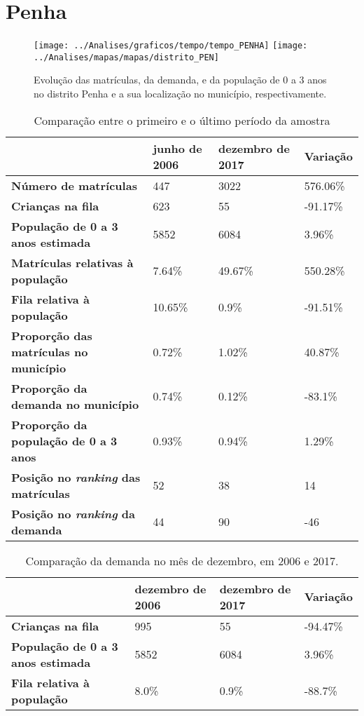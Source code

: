 \section{Penha}
\begin{figure}[H]
\centering
\texttt{[image: ../Analises/graficos/tempo/tempo\_PENHA]}
\texttt{[image: ../Analises/mapas/mapas/distrito\_PEN]}
\caption{Evolução das matrículas, da demanda, e da população de 0 a 3 anos no distrito Penha e a sua localização no município, respectivamente.}
\end{figure}
\begin{table}[H]
\begin{tabular}{l|l|l|l}
\textbf{}                                      & \textbf{junho de 2006}       & \textbf{dezembro de 2017}    & \textbf{Variação} \\ \hline
\textbf{Número de matrículas}                  & 447 & 3022 & 576.06\% \\ \hline
\textbf{Crianças na fila}                      & 623 & 55 & -91.17\% \\ \hline
\textbf{População de 0 a 3 anos estimada}      & 5852 & 6084 & 3.96\% \\ \hline
\textbf{Matrículas relativas à população}      & 7.64\% & 49.67\% & 550.28\% \\ \hline
\textbf{Fila relativa à população}             & 10.65\% & 0.9\% & -91.51\% \\ \hline
\textbf{Proporção das matrículas no município} & 0.72\% & 1.02\% & 40.87\% \\ \hline
\textbf{Proporção da demanda no município}     & 0.74\% & 0.12\% & -83.1\% \\ \hline
\textbf{Proporção da população de 0 a 3 anos}  & 0.93\% & 0.94\% & 1.29\% \\ \hline
\textbf{Posição no \textit{ranking} das matrículas}     & 52 & 38 & 14 \\ \hline
\textbf{Posição no \textit{ranking} da demanda}         & 44 & 90 & -46 \\ 
\end{tabular}
\caption{Comparação entre o primeiro e o último período da amostra}
\end{table}
\begin{table}[H]
\begin{tabular}{l|l|l|l}
\textbf{}                                 & \textbf{dezembro de 2006} & \textbf{dezembro de 2017} & \textbf{Variação} \\ \hline
\textbf{Crianças na fila}                      & 995 & 55 & -94.47\% \\ \hline
\textbf{População de 0 a 3 anos estimada}      & 5852 & 6084 & 3.96\% \\ \hline
\textbf{Fila relativa à população}             & 8.0\% & 0.9\% & -88.7\% \\
\end{tabular}
\caption{Comparação da demanda no mês de dezembro, em 2006 e 2017.}
\end{table}
